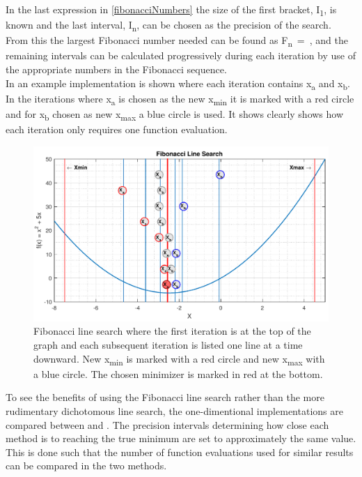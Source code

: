 In the last expression in \eqref{fibonacciNumbers} the size of the first bracket, \si{I_1}, is known and the last interval, \si{I_n}, can be chosen as the precision of the search. From this the largest Fibonacci number needed can be found as \si{F_n = }, and the remaining intervals can be calculated progressively during each iteration by use of the appropriate numbers in the Fibonacci sequence.\\
In  an example implementation is shown where each iteration contains \si{x_a} and \si{x_b}. In the iterations where \si{x_a} is chosen as the new \si{x_{min}} it is marked with a red circle and for \si{x_b} chosen as new \si{x_{max}} a blue circle is used. It shows clearly shows how each iteration only requires one function evaluation.

\begin{figure}[H] 
	\centering
	\includegraphics[width=.8\textwidth]{figures/fibonacciLineSearchComprehension}
	\caption{Fibonacci line search where the first iteration is at the top of the graph and each subsequent iteration is listed one line at a time downward. New \si{x_{min}} is marked with a red circle and new \si{x_{max}} with a blue circle. The chosen minimizer is marked in red at the bottom.}
	\label{fibonacciLineSearchComprehensive}
\end{figure}

To see the benefits of using the Fibonacci line search rather than the more rudimentary dichotomous line search, the one-dimentional implementations are compared between  and . The precision intervals determining how close each method is to reaching the true minimum are set to approximately the same value. This is done such that the number of function evaluations used for similar results can be compared in the two methods.

